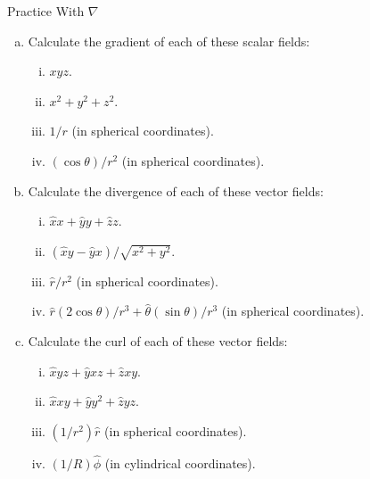 \documentclass{esg8022pset}
\begin{document}
\begin{problem}{Practice With \texorpdfstring{$\nabla$}{∇}}
  \begin{enumerate}[(a)]
    \item Calculate the gradient of each of these scalar fields:
      \begin{enumerate}[(i)]
        \item $xyz$.
        \item $x^2 + y^2 + z^2$.
        \item $1/r$ (in spherical coordinates).
        \item $(\cos\theta) / r^2$ (in spherical coordinates).
      \end{enumerate}
    \item Calculate the divergence of each of these vector fields:
      \begin{enumerate}[(i)]
        \item $\hat{x} x + \hat{y} y + \hat{z} z$.
        \item $(\hat{x} y - \hat{y} x) / \sqrt{x^2 + y^2}$.
        \item $\hat{r}/r^2$ (in spherical coordinates).
        \item $\hat{r}(2\cos\theta)/r^3 + \hat{\theta}(\sin\theta)/r^3$ (in spherical coordinates).
      \end{enumerate}
    \item Calculate the curl of each of these vector fields:
      \begin{enumerate}[(i)]
        \item $\hat{x} yz + \hat{y} xz + \hat{z} xy$.
        \item $\hat{x} xy + \hat{y} y^2 + \hat{z} yz$.
        \item $(1/r^2)\hat{r}$ (in spherical coordinates).
        \item $(1/R)\hat{\phi}$ (in cylindrical coordinates).
      \end{enumerate}
  \end{enumerate}
\end{problem}
\end{document}
